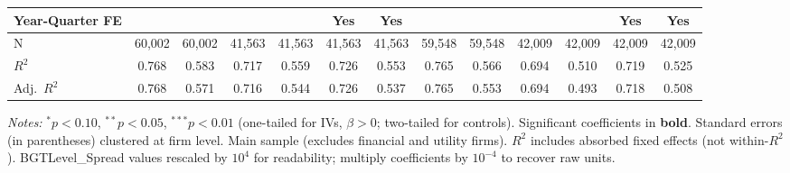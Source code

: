 \begin{landscape}
\begin{table}[H]
\begin{tabular}{lcccccccccccc}
Year-Quarter FE &  &  &  &  & Yes & Yes &  &  &  &  & Yes & Yes \\
\midrule
N & 60,002 & 60,002 & 41,563 & 41,563 & 41,563 & 41,563 & 59,548 & 59,548 & 42,009 & 42,009 & 42,009 & 42,009 \\
$R^2$ & 0.768 & 0.583 & 0.717 & 0.559 & 0.726 & 0.553 & 0.765 & 0.566 & 0.694 & 0.510 & 0.719 & 0.525 \\
Adj.~$R^2$ & 0.768 & 0.571 & 0.716 & 0.544 & 0.726 & 0.537 & 0.765 & 0.553 & 0.694 & 0.493 & 0.718 & 0.508 \\
\bottomrule
\end{tabular}
\begin{minipage}{\linewidth}
\vspace{2pt}\scriptsize
\textit{Notes:} $^{*}p<0.10$, $^{**}p<0.05$, $^{***}p<0.01$ (one-tailed for IVs, $\beta > 0$; two-tailed for controls).
 Significant coefficients in \textbf{bold}.
 Standard errors (in parentheses) clustered at firm level.
 Main sample (excludes financial and utility firms).
 $R^2$ includes absorbed fixed effects (not within-$R^2$).
 BGTLevel\_Spread values rescaled by $10^4$ for readability; multiply coefficients by $10^{-4}$ to recover raw units.
\end{minipage}
\end{table}
\end{landscape}